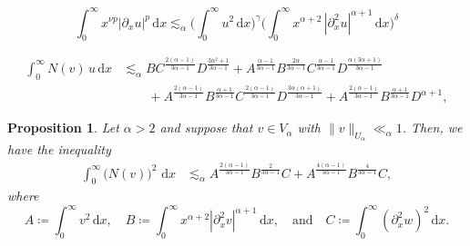 \documentclass[10pt,a4paper]{amsart}
\newtheorem{proposition}{Proposition}
\renewcommand{\d}{\ensuremath{\mathrm{d}}}
\begin{document}
 \begin{equation}
\int_0^\infty x^{\nu p} |\partial _x u|^p \, \d x \lesssim_\alpha \Big(\int_0^\infty u^2 \, \d x\Big)^\gamma \Big(\int_0^\infty x^{\alpha+2} \, |\partial_x^2 u|^{\alpha+1} \, \d x\Big)^\delta
 \end{equation}

\begin{align}\nonumber
    \int_0^\infty N(v)\, u\, \d x
    & \lesssim_\alpha
    B C^\frac{2(\alpha-1)}{3\alpha-1} D^\frac{3\alpha^2+1}{3\alpha-1} 
    +
    A^\frac{\alpha-1}{3\alpha-1}
    B^\frac{2\alpha}{3\alpha-1}
    C^\frac{\alpha-1}{3\alpha-1} 
    D^\frac{\alpha(3\alpha+1)}{3\alpha-1}
    \\
    &\qquad
    + 
    A^\frac{2(\alpha-1)}{3\alpha-1} B^\frac{\alpha+1}{3\alpha-1}
    C^\frac{2(\alpha-1)}{3\alpha-1} 
    D^\frac{3\alpha(\alpha+1)}{3\alpha-1}
    + 
    A^\frac{2(\alpha-1)}{3\alpha-1} B^\frac{\alpha+1}{3\alpha-1} 
    D^{\alpha+1},\label{est-N(v)u}
\end{align}

\begin{proposition}\label{prop-est-nv}
Let $\alpha > 2$ and suppose that $v \in V_\alpha$ with  $\|v\|_{U_\alpha} \ll_\alpha 1$. Then, we have the inequality
%
\begin{align}\label{est-nv}
    \int_0^\infty \big(N(v)\big)^2\, \, \d x
    &\lesssim_\alpha
    A^\frac{2(\alpha-1)}{3\alpha-1}
    B^\frac{2}{3\alpha-1}
    C+
    A^\frac{4(\alpha-1)}{3\alpha-1}
    B^\frac{4}{3\alpha-1}
    C, 
\end{align}
%
where
%
\begin{equation}\label{eq:def_ABC_2}
    A \coloneq 
    \int_0^\infty v^2\, \d x,
    \quad
    B \coloneq \int_0^\infty x^{\alpha+2} |\partial_x^2 v|^{\alpha+1}\, \d x,
    \quad \text{and} \quad
    C \coloneq \int_0^\infty (\partial_x^2 w)^2\, \d x.
\end{equation}
\end{proposition}
\end{document}
